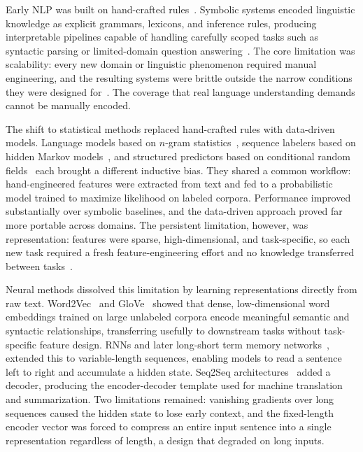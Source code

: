 \begin{foldable}
  Early \ac{NLP} was built on hand-crafted rules~\cite{chomsky1956three}.
  Symbolic systems encoded linguistic knowledge as explicit grammars, lexicons, and inference rules, producing interpretable pipelines capable of handling carefully scoped tasks such as syntactic parsing or limited-domain question answering~\cite{winograd1971procedures}.
  The core limitation was scalability: every new domain or linguistic phenomenon required manual engineering, and the resulting systems were brittle outside the narrow conditions they were designed for~\cite{manning1999foundations}.
  The coverage that real language understanding demands cannot be manually encoded.
\end{foldable}

\begin{foldable}
  The shift to statistical methods replaced hand-crafted rules with data-driven models.
  Language models based on $n$-gram statistics~\cite{shannon1948mathematical}, sequence labelers based on hidden Markov models~\cite{rabiner2002tutorial}, and structured predictors based on conditional random fields~\cite{lafferty2001conditional} each brought a different inductive bias.
  They shared a common workflow: hand-engineered features were extracted from text and fed to a probabilistic model trained to maximize likelihood on labeled corpora.
  Performance improved substantially over symbolic baselines, and the data-driven approach proved far more portable across domains.
  The persistent limitation, however, was representation: features were sparse, high-dimensional, and task-specific, so each new task required a fresh feature-engineering effort and no knowledge transferred between tasks~\cite{bengio2003neural}.
\end{foldable}

\begin{foldable}
  Neural methods dissolved this limitation by learning representations directly from raw text.
  Word2Vec~\cite{mikolov2013distributed} and GloVe~\cite{pennington2014glove} showed that dense, low-dimensional word embeddings trained on large unlabeled corpora encode meaningful semantic and syntactic relationships, transferring usefully to downstream tasks without task-specific feature design.
  \Acp{RNN} and later long-short term memory networks~\cite{hochreiter1997long}, extended this to variable-length sequences, enabling models to read a sentence left to right and accumulate a hidden state.
  Seq2Seq architectures~\cite{sutskever2014sequence} added a decoder, producing the encoder-decoder template used for machine translation and summarization.
  Two limitations remained: vanishing gradients over long sequences caused the hidden state to lose early context, and the fixed-length encoder vector was forced to compress an entire input sentence into a single representation regardless of length, a design that degraded on long inputs.
\end{foldable}

